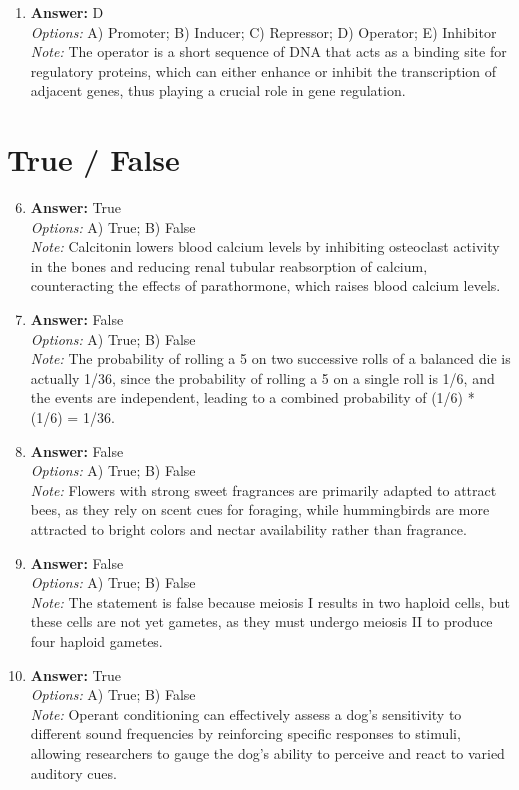\documentclass[12pt]{article}
\begin{document}
\begin{enumerate}[label=\arabic*.]
\\ \textit{Note:} Smaller cells have a higher surface area-to-volume ratio, which enhances their ability to efficiently exchange materials with their environment and makes them less vulnerable to damage from external factors.
\item \textbf{Answer:} D
\\ \textit{Options:} A) Promoter; B) Inducer; C) Repressor; D) Operator; E) Inhibitor
\\ \textit{Note:} The operator is a short sequence of DNA that acts as a binding site for regulatory proteins, which can either enhance or inhibit the transcription of adjacent genes, thus playing a crucial role in gene regulation.
\end{enumerate}

\section*{True / False}
\begin{enumerate}[label=\arabic*.]
\setcounter{enumi}{5}
\item \textbf{Answer:} True
\\ \textit{Options:} A) True; B) False
\\ \textit{Note:} Calcitonin lowers blood calcium levels by inhibiting osteoclast activity in the bones and reducing renal tubular reabsorption of calcium, counteracting the effects of parathormone, which raises blood calcium levels.
\item \textbf{Answer:} False
\\ \textit{Options:} A) True; B) False
\\ \textit{Note:} The probability of rolling a 5 on two successive rolls of a balanced die is actually 1/36, since the probability of rolling a 5 on a single roll is 1/6, and the events are independent, leading to a combined probability of (1/6) * (1/6) = 1/36.
\item \textbf{Answer:} False
\\ \textit{Options:} A) True; B) False
\\ \textit{Note:} Flowers with strong sweet fragrances are primarily adapted to attract bees, as they rely on scent cues for foraging, while hummingbirds are more attracted to bright colors and nectar availability rather than fragrance.
\item \textbf{Answer:} False
\\ \textit{Options:} A) True; B) False
\\ \textit{Note:} The statement is false because meiosis I results in two haploid cells, but these cells are not yet gametes, as they must undergo meiosis II to produce four haploid gametes.
\item \textbf{Answer:} True
\\ \textit{Options:} A) True; B) False
\\ \textit{Note:} Operant conditioning can effectively assess a dog's sensitivity to different sound frequencies by reinforcing specific responses to stimuli, allowing researchers to gauge the dog's ability to perceive and react to varied auditory cues.
\end{enumerate}
\end{document}
